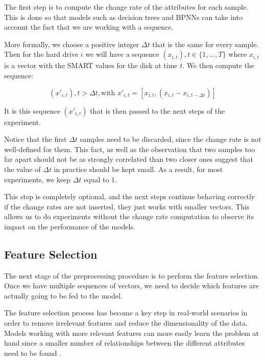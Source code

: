 The first step is to compute the change rate of the attributes for each sample.
This is done so that models such as decision trees and BPNNs can take into account the fact that we are working with a sequence.

More formally, we choose a positive integer $\Delta t$ that is the same for every sample.
Then for the hard drive $i$ we will have a sequence $(x_{i,t}), t \in \{1,\dots,T\}$ where $x_{i,t}$ is a vector with the SMART values for the disk at time $t$.
We then compute the sequence:

\begin{equation}\label{eq:change_rate}
(x'_{i,t}), t > \Delta t, \text{with } x'_{i,t} = [x_{i,t}, (x_{i,t} - x_{i,t-\Delta t})]
\end{equation}

It is this sequence $(x'_{i,t})$ that is then passed to the next steps of the experiment.

Notice that the first $\Delta t$ samples need to be discarded, since the change rate is not well-defined for them.
This fact, as well as the observation that two samples too far apart should not be as strongly correlated than two closer ones suggest that the value of $\Delta t$ in practice should be kept small.
As a result, for most experiments, we keep $\Delta t$ equal to 1.

This step is completely optional, and the next steps continue behaving correctly if the change rates are not inserted, they just works with smaller vectors.
This allows us to do experiments without the change rate computation to observe its impact on the performance of the models.

\subsection{Feature Selection}\label{subsec:feature_selection}

The next stage of the preprocessing procedure is to perform the feature selection.
Once we have multiple sequences of vectors, we need to decide which features are actually going to be fed to the model.

The feature selection process has become a key step in real-world scenarios in order to remove irrelevant features and reduce the dimensionality of the data.
Models working with more relevant features can more easily learn the problem at hand since a smaller number of relationships between the different attributes need to be found \cite{kumar2014feature}.

